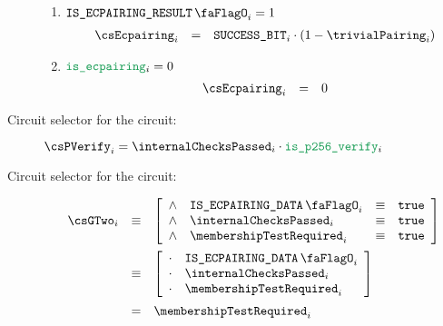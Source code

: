 \begin{description}
\begin {enumerate}
\[\begin{array}{lcl}
                        & =      & \acceptablePairOfPoints_{i} \\
                    \end{array}
                \]
            \item \If $\isEcpairingResult_{i} = 1$ \Then
                \[
                    \begin{array}{lcl}
                        \csEcpairing_{i} & = & \ecdataSuccessBit_{i} \cdot (1 - \trivialPairing_{i})
                    \end{array}
                \]
            \item \If $\locIsEcpairing_{i} = 0$ \Then
                \[
                    \begin{array}{lcl}
                        \csEcpairing_{i} & = & 0
                    \end{array}
                \]
        \end{enumerate}
    \item[Circuit selector for the \instPVerify{} circuit:]
        $\csPVerify_{i} = \internalChecksPassed_{i} \cdot \locIsPVerify_{i}$
    \item[Circuit selector for the \inst{G2\_MEMBERSHIP\_TEST} circuit:]
        \[
            \begin{array}{lcl}
                \csGTwo_{i} & \equiv &
                \left[ \begin{array}{clcr}
                    \wedge & \isEcpairingData_{i}        & \equiv & \texttt{true} \\
                    \wedge & \internalChecksPassed_{i}   & \equiv & \texttt{true} \\
                    \wedge & \membershipTestRequired_{i} & \equiv & \texttt{true} \\
                \end{array} \right] \vspace{2mm} \\
                & \equiv & 
                \left[ \begin{array}{clcr}
                    \cdot & \isEcpairingData_{i}        \\
                    \cdot & \internalChecksPassed_{i}   \\
                    \cdot & \membershipTestRequired_{i} \\
                \end{array} \right] \vspace{2mm} \\
                & =      & \membershipTestRequired_{i} \\
            \end{array}
        \]
\end{description}

